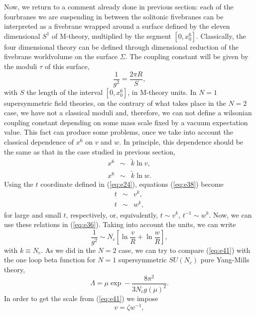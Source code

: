 Now, we return to a comment already done in previous section: each of the
fourbranes we are suspending in between the solitonic fivebranes
can be interpreted as a fivebrane wrapped around a surface
defined by the eleven dimensional $S^1$ of M-theory, multiplied
by the segment $[0,x^6_0]$. Classically, the four dimensional
theory can be defined through dimensional reduction of the
fivebrane worldvolume on the surface $\Sigma$. The coupling
constant will be given by the moduli $\tau$ of this surface,
\begin{equation}
\frac {1}{g^2} = \frac {2 \pi R}{S},
\label{eq:e37}
\end{equation}
with $S$ the length of the interval $[0,x^6_0]$, in M-theory
units. In $N=1$ supersymmetric field theories, on the contrary of
what takes place in the $N=2$ case, we have not a classical
moduli and, therefore, we can not define a wilsonian coupling
constant depending on some mass scale fixed by a vacuum
expectation value. This fact can produce some problems, once we
take into account the classical dependence of $x^6$ on $v$ and
$w$. In principle, this dependence should be the same as that in
the case studied in previous section,
\begin{eqnarray}
x^6 & \sim & \tilde{k} \ln v, \nonumber \\
x^6 & \sim & \tilde{k} \ln w.
\label{eq:e38}
\end{eqnarray}
Using the $t$ coordinate defined in (\ref{eq:e24}), equations
(\ref{eq:e38}) become
\begin{eqnarray}
t & \sim & v^k, \nonumber \\
t & \sim & w^k,
\label{eq:e39}
\end{eqnarray}
for large and small $t$, respectively, or, equivalently, $t \sim
v^k$, $t^{-1} \sim w^k$.
Now, we can use these relations in (\ref{eq:e36}). Taking into
account the units, we can write
\begin{equation}
\frac {1}{g^2} \sim N_c [\ln \frac {v}{R}+\ln \frac {w}{R}],
\label{eq:e41}
\end{equation}
with $k \equiv N_c$. As we did in the $N=2$ case, we can try to
compare (\ref{eq:e41}) with the one loop beta function for $N=1$
supersymmetric $SU(N_c)$ pure Yang-Mills theory,
\begin{equation}
\Lambda = \mu \exp - \frac {8 \pi^2}{3 N_c g(\mu)^2}.
\label{n=1}
\end{equation}
In order to get the scale from (\ref{eq:e41}) we impose
\begin{equation}
v = \zeta w^{-1},
\label{eq:e42}
\end{equation}
